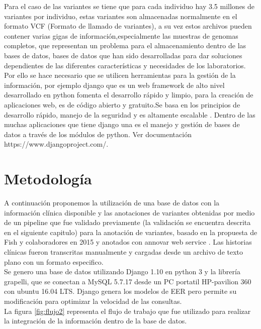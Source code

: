 Para el caso de las variantes se tiene que para cada individuo hay 3.5 millones de variantes por individuo, estas variantes son almacenadas normalmente en el formato VCF (Formato de llamado de variantes), a su vez estos archivos pueden contener varias gigas de información,especialmente las muestras de genomas completos, que representan un problema para el almacenamiento dentro de las bases de datos, bases de datos que han sido desarrolladas para dar soluciones dependientes de las diferentes características y necesidades de los laboratorios\cite{Kutzera2017}.\\

Por ello se hace necesario que se utilicen herramientas para la gestión de la información, por ejemplo django que es un web framework de alto nivel desarrollado en python  fomenta el desarrollo rápido y limpio, para la creación de aplicaciones web, es de código abierto y gratuito.Se basa en los principios de desarrollo rápido, manejo de la seguridad y es altamente escalable . Dentro de las muchas aplicaciones que tiene django una es el manejo y gestión de bases de datos a través de los módulos de python. Ver documentación https://www.djangoproject.com/. 

\section{Metodología}

A continuación proponemos la utilización de una base de datos con la información clínica disponible y las anotaciones de variantes obtenidas por medio de un pipeline que fue validado previamente (la validación se encuentra descrita en el siguiente capitulo) para la anotación de variantes, basado en la propuesta de Fish y colaboradores en 2015 \cite{Fisch2015} y anotados con annovar web service \cite{Yang2015}. Las historias clínicas fueron transcritas manualmente y cargadas desde un archivo de texto plano con un formato especifico.\\

Se genero una base de datos utilizando Django 1.10 en python 3 y la librería grapelli, que se conectan  a  MySQL  5.7.17 desde un PC portatil HP-pavilion 360 con ubuntu 16.04 LTS. Django genera los modelos de EER pero permite su modificación para optimizar la velocidad de las consultas. \\

La figura \ref{fig:flujo2} representa el flujo de trabajo que fue utilizado para realizar la integración de la información dentro de la base de datos.

